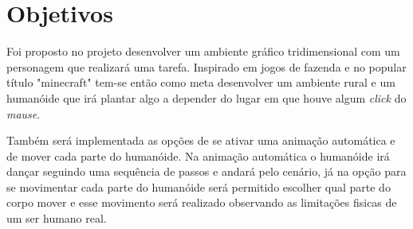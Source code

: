 \documentclass[
	12pt,				%
	openright,			%
	a4paper,			%
	english,			%
	french,				%
	spanish,			%
	brazil,				%
	]{abntex2}
\begin{document}





\chapter[Objetivos]{Objetivos}

	 Foi proposto no projeto desenvolver um ambiente gráfico tridimensional com um personagem que realizará uma tarefa. Inspirado em jogos de fazenda e no popular título "minecraft" tem-se então como meta desenvolver um ambiente rural e um humanóide que irá plantar algo a depender do lugar em que houve algum \emph{click} do  \emph{mause}.

	Também será implementada as opções de se ativar uma animação automática e de mover cada parte do humanóide. Na animação automática o humanóide irá dançar seguindo uma sequência de passos e andará pelo cenário, já na opção para se movimentar cada parte do humanóide será permitido escolher qual parte do corpo mover e esse movimento será realizado observando as limitações fisicas de um ser humano real.  
\end{document}
